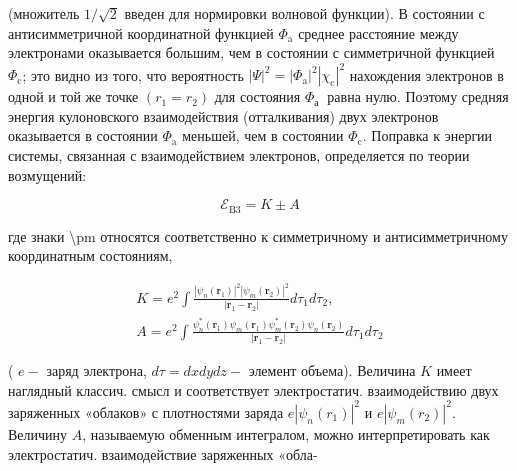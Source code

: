 \documentclass[10pt]{article}
\begin{document}
(множитель $1 / \sqrt{2}$ введен для нормировки волновой функции). В состоянии с антисимметричной координатной функцией $\Phi_{\mathrm{a}}$ среднее расстояние между электронами оказывается большим, чем в состоянии с симметричной функцией $\Phi_{\mathrm{c}}$; это видно из того, что вероятность $|\Psi|^{2}=\left|\Phi_{\mathrm{a}}\right|^{2}\left|\chi_{\mathrm{c}}\right|^{2}$ нахождения электронов в одной и той же точке $\left(r_{1}=r_{2}\right)$ для состояния $\Phi_{\text {а }}$ равна нулю. Поэтому средняя энергия кулоновского взаимодействия (отталкивания) двух электронов оказывается в состоянии $\Phi_{\mathrm{a}}$ меньшей, чем в состоянии $\Phi_{\mathrm{c}}$. Поправка к энергии системы, связанная с взаимодействием электронов, определяется по теории возмущений:



\[

\mathscr{E}_{\mathrm{B} 3}=K \pm A

\]



где знаки \textbackslash pm относятся соответственно к симметричному и антисимметричному координатным состояниям,



\[

\begin{gathered}

K=e^{2} \int \frac{\left|\psi_{n}\left(\boldsymbol{r}_{1}\right)\right|^{2}\left|\psi_{m}\left(\boldsymbol{r}_{2}\right)\right|^{2}}{\left|\boldsymbol{r}_{1}-\boldsymbol{r}_{2}\right|} d \tau_{1} d \tau_{2}, \\

A=e^{2} \int \frac{\psi_{n}^{*}\left(\boldsymbol{r}_{1}\right) \psi_{m}\left(\boldsymbol{r}_{1}\right) \psi_{m}^{*}\left(\boldsymbol{r}_{2}\right) \psi_{n}\left(\boldsymbol{r}_{2}\right)}{\left|\boldsymbol{r}_{1}-\boldsymbol{r}_{2}\right|} d \tau_{1} d \tau_{2}

\end{gathered}

\]



( $e-$ заряд электрона, $d \tau=d x d y d z-$ элемент объема). Величина $K$ имеет наглядный классич. смысл и соответствует электростатич. взаимодействию двух заряженных «облаков» с плотностями заряда $e\left|\psi_{n}\left(r_{1}\right)\right|^{2}$ и $e\left|\psi_{m}\left(r_{2}\right)\right|^{2}$. Величину $A$, называемую обменным интегралом, можно интерпретировать как электростатич. взаимодействие заряженных «обла-
\end{document}
